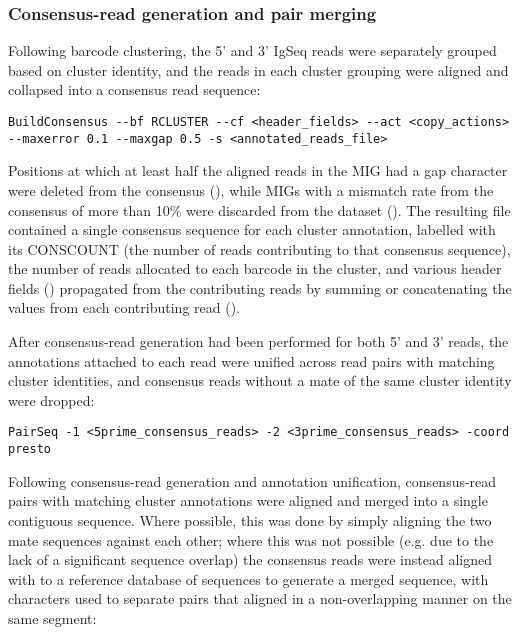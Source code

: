 {\subsubsection{Consensus-read generation and pair merging}
\label{sec:methods_comp_igpreproc_consensus}

Following barcode clustering, the 5' and 3' IgSeq reads were separately grouped based on cluster identity, and the reads in each cluster grouping were aligned and collapsed into a consensus read sequence:

\begin{lstlisting}
BuildConsensus --bf RCLUSTER --cf <header_fields> --act <copy_actions> --maxerror 0.1 --maxgap 0.5 -s <annotated_reads_file>
\end{lstlisting}

Positions at which at least half the aligned reads in the MIG had a gap character were deleted from the consensus (), while MIGs with a mismatch rate from the consensus of more than 10\% were discarded from the dataset (). The resulting  file contained a single consensus sequence for each cluster annotation, labelled with its CONSCOUNT (the number of reads contributing to that consensus sequence),  the number of reads allocated to each barcode in the cluster, and various header fields () propagated from the contributing reads by summing or concatenating the values from each contributing read (). 

After consensus-read generation had been performed for both 5' and 3' reads, the annotations attached to each read were unified across read pairs with matching cluster identities, and consensus reads without a mate of the same cluster identity were dropped:

\begin{lstlisting}
PairSeq -1 <5prime_consensus_reads> -2 <3prime_consensus_reads> -coord presto
\end{lstlisting}

Following consensus-read generation and annotation unification, consensus-read pairs with matching cluster annotations were aligned and merged into a single contiguous sequence. Where possible, this was done by simply aligning the two mate sequences against each other; where this was not possible (e.g. due to the lack of a significant sequence overlap) the consensus reads were instead aligned with  \parencite{altschul1990blast,altschul1997blast} to a reference database of \vh sequences to generate a merged sequence, with  characters used to separate pairs that aligned in a non-overlapping manner on the same \vh segment:

}
